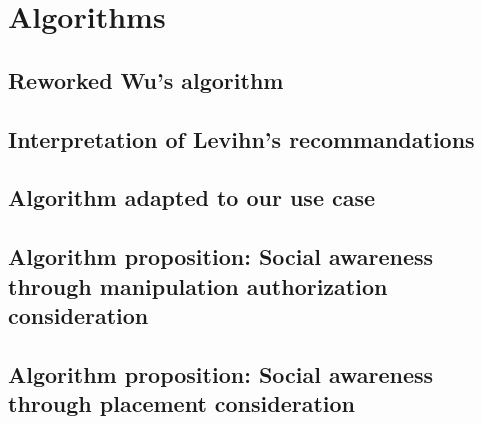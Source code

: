 \chapter{Algorithms}\label{algorithms}

\section{Reworked Wu's algorithm}\label{reworked_wu_section}





\section{Interpretation of Levihn's recommandations}\label{levihn_interpretation_section}







\section{Algorithm adapted to our use case}\label{basicmods_section}





\section{Algorithm proposition: Social awareness through manipulation authorization consideration}\label{observation_section}









\section{Algorithm proposition: Social awareness through placement consideration}\label{placement_section}

